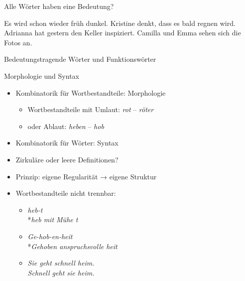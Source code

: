 \begin{frame}
  {Alle Wörter haben eine Bedeutung?}
  \pause
  \begin{exe}
    \ex \alert{Es} \alert{wird} schon wieder früh dunkel.
    \pause
    \ex Kristine denkt, \alert{dass} \alert{es} bald regnen \alert{wird}.
    \pause
    \ex Adrianna \alert{hat} gestern \alert{den} Keller inspiziert.
    \pause
    \ex Camilla \alert{und} Emma sehen \alert{sich} \alert{die} Fotos \alert{an}.
  \end{exe}
  \Zeile
  \pause
  \large
  \alert{Bedeutungstragende} Wörter und \alert{Funktionswörter}
\end{frame}

\begin{frame}
  {Morphologie und Syntax}
  \pause
  \begin{itemize}[<+->]
    \item Kombinatorik für \alert{Wortbestandteile}: Morphologie
      \begin{itemize}[<+->]
        \item Wortbestandteile \zB mit \alert{Umlaut}: \textit{rot} -- \textit{röter}
        \item oder \alert{Ablaut}: \textit{heben} -- \textit{hob}
      \end{itemize}
    \item Kombinatorik für \alert{Wörter}: Syntax
      \Zeile
    \item \alert{Zirkuläre oder leere Definitionen?}
    \item {} Prinzip: eigene Regularität → eigene Struktur
      \Zeile
    \item Wortbestandteile \alert{nicht trennbar}:
      \begin{itemize}
        \item \textit{heb-t}\\
          *\textit{heb mit Mühe t}
        \item \textit{Ge-hob-en-heit} \\
          *\textit{Gehoben anspruchsvolle heit}
        \item \textit{Sie geht schnell heim.}\\
          \textit{Schnell geht sie heim.}
      \end{itemize}
  \end{itemize}
\end{frame}

